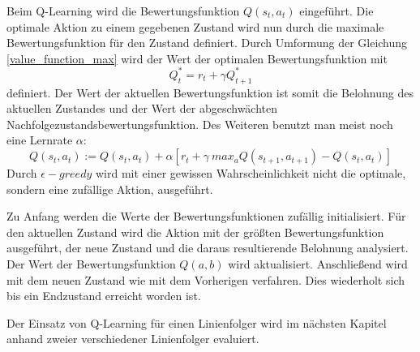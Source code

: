 Beim Q-Learning wird die Bewertungsfunktion $Q(s_t, a_t)$ eingeführt. Die optimale Aktion zu einem gegebenen Zustand wird nun durch die maximale Bewertungsfunktion für den Zustand definiert. Durch Umformung der Gleichung \ref{value_function_max} wird der Wert der optimalen Bewertungsfunktion mit
\begin{equation}
	Q^{*}_t = r_t + \gamma Q^{*}_{t+1}
\end{equation} 
definiert. Der Wert der aktuellen Bewertungsfunktion ist somit die Belohnung des aktuellen Zustandes und der Wert der abgeschwächten Nachfolgezustandsbewertungsfunktion. Des Weiteren benutzt man meist noch eine Lernrate $\alpha$:
\begin{equation}
	Q(s_t, a_t) := Q(s_t, a_t) + \alpha[r_t + \gamma \ max_a Q(s_{t+1}, a_{t+1}) - Q(s_t, a_t)]
\end{equation}
Durch $\epsilon-greedy$ wird mit einer gewissen Wahrscheinlichkeit nicht die optimale, sondern eine zufällige Aktion, ausgeführt. \cite{Ertel_2013}\par
Zu Anfang werden die Werte der Bewertungsfunktionen zufällig initialisiert. Für den aktuellen Zustand wird die Aktion mit der größten Bewertungsfunktion ausgeführt, der neue Zustand und die daraus resultierende Belohnung analysiert. Der Wert der Bewertungsfunktion $Q(a, b)$ wird aktualisiert. Anschließend wird mit dem neuen Zustand wie mit dem Vorherigen verfahren. Dies wiederholt sich bis ein Endzustand erreicht worden ist. \cite{Ertel_2013}\par
Der Einsatz von Q-Learning für einen Linienfolger wird im nächsten Kapitel anhand zweier verschiedener Linienfolger evaluiert.
